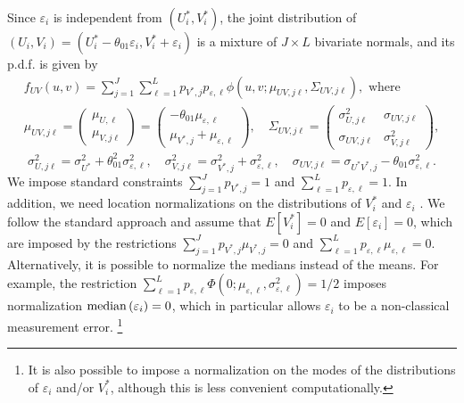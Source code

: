 \documentclass[12pt]{article}
\def\limfunc#1{\mathop{\rm #1}}%
\begin{document}
Since $\varepsilon _{i}$ is independent from $\left( U_{i}^{\ast
},V_{i}^{\ast }\right) $, the joint distribution of $\left(
U_{i},V_{i}\right) =\left( U_{i}^{\ast }-\theta _{01}\varepsilon
_{i},V_{i}^{\ast }+\varepsilon _{i}\right) $ is a mixture of $J\times L$
bivariate normals, and its p.d.f. is given by 
\begin{gather*}
f_{UV}(u,v)=\sum_{j=1}^{J}\sum_{\ell =1}^{L}p_{V^{\ast },j}p_{\varepsilon
,\ell }\phi (u,v;\mu _{UV,j\ell },\Sigma _{UV,j\ell }),\text{ where} \\
\mu _{UV,j\ell }=%
\begin{pmatrix}
\mu _{U,\ell } \\ 
\mu _{V,j\ell }%
\end{pmatrix}%
=%
\begin{pmatrix}
-\theta _{01}\mu _{\varepsilon ,\ell } \\ 
\mu _{V^{\ast },j}+\mu _{\varepsilon ,\ell }%
\end{pmatrix}%
,\quad \Sigma _{UV,j\ell }=%
\begin{pmatrix}
\sigma _{U,j\ell }^{2} & \sigma _{UV,j\ell } \\ 
\sigma _{UV,j\ell } & \sigma _{V,j\ell }^{2}%
\end{pmatrix}%
,
\end{gather*}%
\begin{equation}
\sigma _{U,j\ell }^{2}=\sigma _{U^{\ast }}^{2}+\theta _{01}^{2}\sigma
_{\varepsilon ,\ell }^{2},\quad \sigma _{V,j\ell }^{2}=\sigma _{V^{\ast
},j}^{2}+\sigma _{\varepsilon ,\ell }^{2},\quad \sigma _{UV,j\ell }=\sigma
_{U^{\ast }V^{\ast },j}-\theta _{01}\sigma _{\varepsilon ,\ell }^{2}.
\label{eq:general reduced form to structural relationship}
\end{equation}%
We impose standard constraints $\sum_{j=1}^{J}p_{V^{\ast },j}=1$ and $%
\sum_{\ell =1}^{L}p_{\varepsilon ,\ell }=1$. In addition, we need location
normalizations on the distributions of $V_{i}^{\ast }$ and $\varepsilon _{i}$%
. We follow the standard approach and assume that $E\left[ V_{i}^{\ast }%
\right] =0$ and $E\left[ \varepsilon _{i}\right] =0$, which are imposed by
the restrictions $\sum_{j=1}^{J}p_{V^{\ast },j}\mu _{V^{\ast },j}=0$ and $%
\sum_{\ell =1}^{L}p_{\varepsilon ,\ell }\mu _{\varepsilon ,\ell }=0$.
Alternatively, it is possible to normalize the medians instead of the means.
For example, the restriction $\sum_{\ell =1}^{L}p_{\varepsilon ,\ell }\Phi
(0;\mu _{\varepsilon ,\ell },\sigma _{\varepsilon ,\ell }^{2})=1/2$ imposes
normalization $\limfunc{median}\left( \varepsilon _{i}\right) =0$, which in
particular allows $\varepsilon _{i}$ to be a non-classical measurement error.%
\footnote{%
It is also possible to impose a normalization on the modes of the
distributions of $\varepsilon _{i}$ and/or $V_{i}^{\ast }$, although this is
less convenient computationally.} {}
\end{document}
